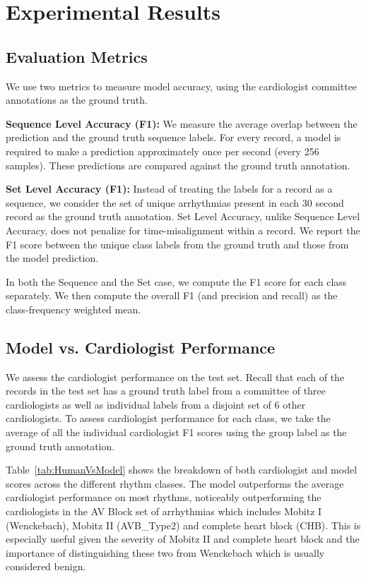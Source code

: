 \section{Experimental Results}

\subsection*{Evaluation Metrics}
We use two metrics to measure model accuracy, using the cardiologist committee
annotations as the ground truth.

\textbf{Sequence Level Accuracy (F1):} We measure the average overlap between
the prediction and the ground truth sequence labels. For every record, a model
is required to make a prediction approximately once per second (every 256
samples). These predictions are compared against the ground truth annotation.

\textbf{Set Level Accuracy (F1):} Instead of treating the labels for a record
as a sequence, we consider the set of unique arrhythmias present in each 30
second record as the ground truth annotation. Set Level Accuracy, unlike
Sequence Level Accuracy, does not penalize for time-misalignment within a
record. We report the F1 score between the unique class labels from the ground
truth and those from the model prediction.

In both the Sequence and the Set case, we compute the F1 score for each class
separately. We then compute the overall F1 (and precision and recall) as the
class-frequency weighted mean.

\subsection*{Model vs. Cardiologist Performance} We assess the cardiologist
performance on the test set. Recall that each of the records in the test set
has a ground truth label from a committee of three cardiologists as well as
individual labels from a disjoint set of 6 other cardiologists. To assess
cardiologist performance for each class, we take the average of all the
individual cardiologist F1 scores using the group label as the ground truth
annotation.

Table~\ref{tab:HumanVsModel} shows the breakdown of both cardiologist and model
scores across the different rhythm classes. The model outperforms the average
cardiologist performance on most rhythms, noticeably outperforming the
cardiologists in the AV Block set of arrhythmias which includes Mobitz I
(Wenckebach), Mobitz II (AVB\_Type2) and complete heart block (CHB). This is
especially useful given the severity of Mobitz II and complete heart block and
the importance of distinguishing these two from Wenckebach which is usually
considered benign.

